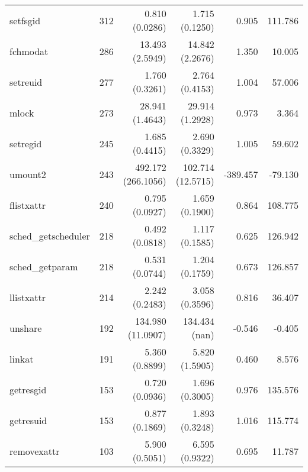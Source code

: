 \begin{longtable}{>{\ttfamily}lrrrrr}
                       setfsgid &        312 &              0.810 (0.0286) &            1.715 (0.1250) &           0.905 &      111.786 \\
                       fchmodat &        286 &             13.493 (2.5949) &           14.842 (2.2676) &           1.350 &       10.005 \\
                       setreuid &        277 &              1.760 (0.3261) &            2.764 (0.4153) &           1.004 &       57.006 \\
                          mlock &        273 &             28.941 (1.4643) &           29.914 (1.2928) &           0.973 &        3.364 \\
                       setregid &        245 &              1.685 (0.4415) &            2.690 (0.3329) &           1.005 &       59.602 \\
                        umount2 &        243 &          492.172 (266.1056) &         102.714 (12.5715) &        -389.457 &      -79.130 \\
                     flistxattr &        240 &              0.795 (0.0927) &            1.659 (0.1900) &           0.864 &      108.775 \\
            sched\_getscheduler &        218 &              0.492 (0.0818) &            1.117 (0.1585) &           0.625 &      126.942 \\
                sched\_getparam &        218 &              0.531 (0.0744) &            1.204 (0.1759) &           0.673 &      126.857 \\
                     llistxattr &        214 &              2.242 (0.2483) &            3.058 (0.3596) &           0.816 &       36.407 \\
                        unshare &        192 &           134.980 (11.0907) &             134.434 (nan) &          -0.546 &       -0.405 \\
                         linkat &        191 &              5.360 (0.8899) &            5.820 (1.5905) &           0.460 &        8.576 \\
                      getresgid &        153 &              0.720 (0.0936) &            1.696 (0.3005) &           0.976 &      135.576 \\
                      getresuid &        153 &              0.877 (0.1869) &            1.893 (0.3248) &           1.016 &      115.774 \\
                    removexattr &        103 &              5.900 (0.5051) &            6.595 (0.9322) &           0.695 &       11.787 \\

\end{longtable}

